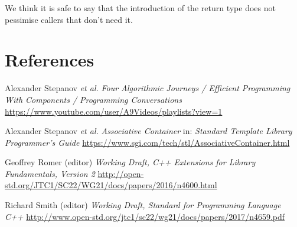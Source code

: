\documentclass[11pt]{article}
\begin{document}
We think it is safe to say that the introduction of the return type
does not pessimise callers that don't need it.

\section{References}
\renewcommand{\section}[2]{}%
\begin{thebibliography}{9}
  Alexander Stepanov \emph{et al.}\newline
  \emph{Four Algorithmic Journeys / Efficient Programming With Components /
    Programming Conversations}\newline
  \url{https://www.youtube.com/user/A9Videos/playlists?view=1}

  Alexander Stepanov \emph{et al.}\newline
  \emph{Associative Container}\newline
  in: \emph{Standard Template Library Programmer's Guide}\newline
  \url{https://www.sgi.com/tech/stl/AssociativeContainer.html}

  Geoffrey Romer (editor)\newline
  \emph{Working Draft, C++ Extensions for Library Fundamentals, Version 2}\newline
  \url{http://open-std.org/JTC1/SC22/WG21/docs/papers/2016/n4600.html}

  Richard Smith (editor)\newline
  \emph{Working Draft, Standard for Programming Language C++}\newline
  \url{http://www.open-std.org/jtc1/sc22/wg21/docs/papers/2017/n4659.pdf}
\end{thebibliography}
\end{document}
